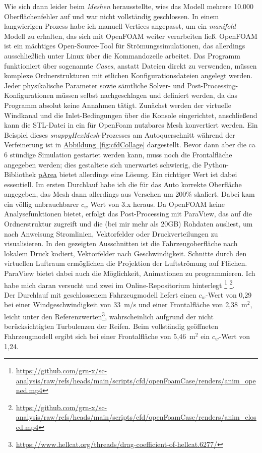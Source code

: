 Wie sich dann leider beim \emph{Meshen} herausstellte, wies das Modell mehrere 10.000 Oberflächenfehler auf und war nicht vollständig geschlossen. In einem langwierigen Prozess habe ich manuell Vertices angepasst, um ein \emph{manifold} Modell zu erhalten, das sich mit OpenFOAM weiter verarbeiten ließ. OpenFOAM ist ein mächtiges Open-Source-Tool für Strömungssimulationen, das allerdings ausschließlich unter Linux über die Kommandozeile arbeitet. Das Programm funktioniert über sogenannte \emph{Cases}, anstatt Dateien direkt zu verwenden, müssen komplexe Ordnerstrukturen mit etlichen Konfigurationsdateien angelegt werden. Jeder physikalische Parameter sowie sämtliche Solver- und Post-Processing-Konfigurationen müssen selbst nachgeschlagen und definiert werden, da das Programm absolut keine Annahmen tätigt. Zunächst werden der virtuelle Windkanal und die Inlet-Bedingungen über die Konsole eingerichtet, anschließend kann die STL-Datei in ein für OpenFoam nutzbares Mesh konvertiert werden. Ein Beispiel dieses \emph{snappyHexMesh}-Prozesses am Autoquerschnitt während der Verfeinerung ist in \hyperref[fig:cfdCollage]{Abbildung~\ref*{fig:cfdCollage}} dargestellt. Bevor dann aber die ca 6 stündige Simulation gestartet werden kann, muss noch die Frontalfläche angegeben werden; dies gestaltete sich unerwartet schwierig, die Python-Bibliothek \href{https://github.com/nathanrooy/p-area}{pArea} bietet allerdings eine Lösung. Ein richtiger Wert ist dabei essentiell. Im ersten Durchlauf habe ich die für das Auto korrekte Oberfläche angegeben, das Mesh dann allerdings aus Versehen um 200\% skaliert. Dabei kam ein völlig unbrauchbarer $c_w$ Wert von 3.x heraus. Da OpenFOAM keine Analysefunktionen bietet, erfolgt das Post-Processing mit ParaView, das auf die Ordnerstruktur zugreift und die (bei mir mehr als 20GB) Rohdaten ausliest, um nach Anweisung Stromlinien, Vektorfelder oder Druckverteilungen zu visualisieren. In den gezeigten Ausschnitten ist die Fahrzeugoberfläche nach lokalem Druck kodiert, Vektorfelder nach Geschwindigkeit. Schnitte durch den virtuellen Luftraum ermöglichen die Projektion der Luftströmung auf Flächen. ParaView bietet dabei auch die Möglichkeit, Animationen zu programmieren. Ich habe mich daran versucht und zwei im Online-Repositorium hinterlegt \footnote{\url{https://github.com/grn-x/sc-analysis/raw/refs/heads/main/scripts/cfd/openFoamCase/renders/anim_opened.mp4}} \footnote{\url{https://github.com/grn-x/sc-analysis/raw/refs/heads/main/scripts/cfd/openFoamCase/renders/anim_closed.mp4}}.  
\\
Der Durchlauf mit geschlossenem Fahrzeugmodell liefert einen \(c_w\)-Wert von 0,29 bei einer Windgeschwindigkeit von 33~m/s und einer Frontalfläche von 2,38~m\(^2\), leicht unter den Referenzwerten\footnote{\url{https://www.hellcat.org/threads/drag-coefficient-of-hellcat.6277/}}, wahrscheinlich aufgrund der nicht berücksichtigten Turbulenzen der Reifen. Beim vollständig geöffneten Fahrzeugmodell ergibt sich bei einer Frontalfläche von 5,46~m\(^2\) ein \(c_w\)-Wert von 1,24.




